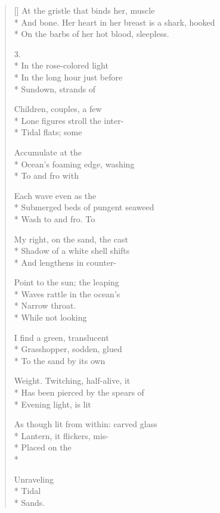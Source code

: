 \begin{verse}[\versewidth]
At the gristle that binds her, muscle\\*
And bone.   Her heart in her breast is a shark, hooked\\*
On the barbs of her hot blood, sleepless.

3.\\*
In the rose-colored light\\*
In the long hour just before \\*
Sundown, strands of

Children, couples, a few\\*
Lone figures stroll the inter-\\*
Tidal flats; some

Accumulate at the \\*
Ocean's foaming edge, washing\\*
To and fro with

Each wave    even   as the\\*
Submerged beds of pungent seaweed\\*
Wash to and fro.     To

My right, on the sand, the cast\\*
Shadow of a white shell shifts\\*
And lengthens in counter-

Point to the sun; the leaping\\*
Waves rattle in the ocean's\\*
Narrow throat.     \\*
\hspace{4\vgap} While not looking

I find a green, translucent\\*
Grasshopper, sodden, glued\\*
To the sand by its own 

Weight. Twitching, half-alive, it\\*
Has been pierced by the spears of\\*
Evening light, is lit

As though lit from within: carved glass\\*
Lantern, it flickers, mis-\\*
Placed on the\\*

\hspace{3\vgap} Unraveling\\*
Tidal\\*
 \qquad Sands.
\end{verse}
